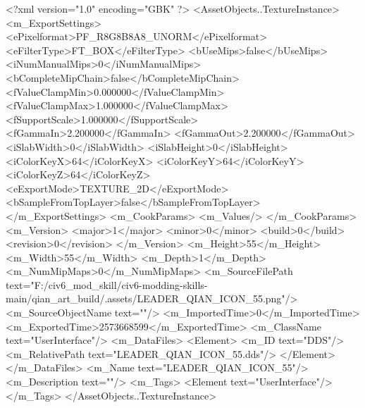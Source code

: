 <?xml version="1.0" encoding="GBK" ?>
<AssetObjects..TextureInstance>
	<m_ExportSettings>
		<ePixelformat>PF_R8G8B8A8_UNORM</ePixelformat>
		<eFilterType>FT_BOX</eFilterType>
		<bUseMips>false</bUseMips>
		<iNumManualMips>0</iNumManualMips>
		<bCompleteMipChain>false</bCompleteMipChain>
		<fValueClampMin>0.000000</fValueClampMin>
		<fValueClampMax>1.000000</fValueClampMax>
		<fSupportScale>1.000000</fSupportScale>
		<fGammaIn>2.200000</fGammaIn>
		<fGammaOut>2.200000</fGammaOut>
		<iSlabWidth>0</iSlabWidth>
		<iSlabHeight>0</iSlabHeight>
		<iColorKeyX>64</iColorKeyX>
		<iColorKeyY>64</iColorKeyY>
		<iColorKeyZ>64</iColorKeyZ>
		<eExportMode>TEXTURE_2D</eExportMode>
		<bSampleFromTopLayer>false</bSampleFromTopLayer>
	</m_ExportSettings>
	<m_CookParams>
		<m_Values/>
	</m_CookParams>
	<m_Version>
		<major>1</major>
		<minor>0</minor>
		<build>0</build>
		<revision>0</revision>
	</m_Version>
	<m_Height>55</m_Height>
	<m_Width>55</m_Width>
	<m_Depth>1</m_Depth>
	<m_NumMipMaps>0</m_NumMipMaps>
	<m_SourceFilePath text="F:/civ6_mod_skill/civ6-modding-skills-main/qian_art_build/.assets/LEADER_QIAN_ICON_55.png"/>
	<m_SourceObjectName text=""/>
	<m_ImportedTime>0</m_ImportedTime>
	<m_ExportedTime>2573668599</m_ExportedTime>
	<m_ClassName text="UserInterface"/>
	<m_DataFiles>
		<Element>
			<m_ID text="DDS"/>
			<m_RelativePath text="LEADER_QIAN_ICON_55.dds"/>
		</Element>
	</m_DataFiles>
	<m_Name text="LEADER_QIAN_ICON_55"/>
	<m_Description text=""/>
	<m_Tags>
		<Element text="UserInterface"/>
	</m_Tags>
</AssetObjects..TextureInstance>
